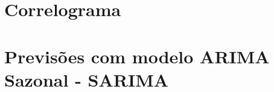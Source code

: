 \section{Correlograma}



\lipsum[100]



\section{Previsões com modelo ARIMA Sazonal - SARIMA}



\lipsum[100]


